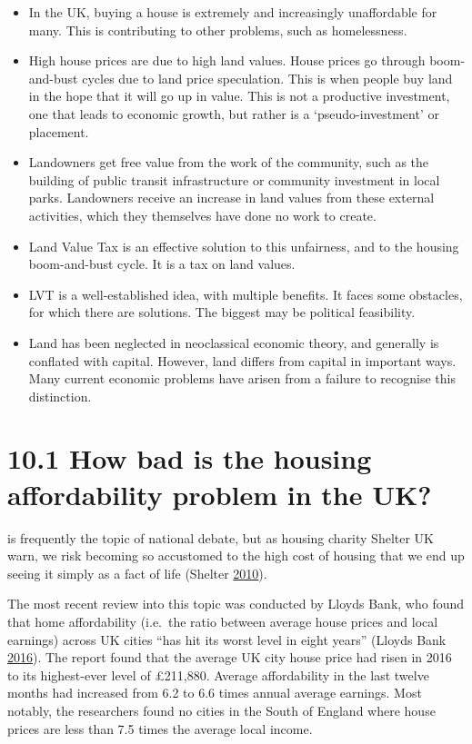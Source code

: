 \documentclass[]{tufte-handout}
\providecommand{\tightlist}{%
  \setlength{\itemsep}{0pt}\setlength{\parskip}{0pt}}
\begin{document}
\begin{itemize}
\tightlist
\item
  In the UK, buying a house is extremely and increasingly unaffordable
  for many. This is contributing to other problems, such as
  homelessness.
\item
  High house prices are due to high land values. House prices go through
  boom-and-bust cycles due to land price speculation. This is when
  people buy land in the hope that it will go up in value. This is not a
  productive investment, one that leads to economic growth, but rather
  is a `pseudo-investment' or placement.
\item
  Landowners get free value from the work of the community, such as the
  building of public transit infrastructure or community investment in
  local parks. Landowners receive an increase in land values from these
  external activities, which they themselves have done no work to
  create.
\item
  Land Value Tax is an effective solution to this unfairness, and to the
  housing boom-and-bust cycle. It is a tax on land values.
\item
  LVT is a well-established idea, with multiple benefits. It faces some
  obstacles, for which there are solutions. The biggest may be political
  feasibility.
\item
  Land has been neglected in neoclassical economic theory, and generally
  is conflated with capital. However, land differs from capital in
  important ways. Many current economic problems have arisen from a
  failure to recognise this distinction.
\end{itemize}

\hypertarget{how-bad-is-the-housing-affordability-problem-in-the-uk}{%
\section{10.1 How bad is the housing affordability problem in the
UK?}\label{how-bad-is-the-housing-affordability-problem-in-the-uk}}

 is frequently the topic of
national debate, but as housing charity Shelter UK warn, we risk
becoming so accustomed to the high cost of housing that we end up seeing
it simply as a fact of life (Shelter
\protect\hyperlink{ref-Shelter2010}{2010}).

The most recent review into this topic was conducted by Lloyds Bank, who
found that home affordability (i.e.~the ratio between average house
prices and local earnings) across UK cities ``has hit its worst level in
eight years'' (Lloyds Bank
\protect\hyperlink{ref-LloydsBank2016}{2016}). The report found that the
average UK city house price had risen in 2016 to its highest-ever level
of £211,880. Average affordability in the last twelve months had
increased from 6.2 to 6.6 times annual average earnings. Most notably,
the researchers found no cities in the South of England where house
prices are less than 7.5 times the average local income.
\end{document}
